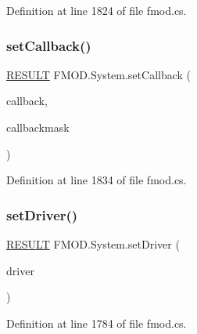 Definition at line 1824 of file fmod.\+cs.

\mbox{\label{class_f_m_o_d_1_1_system_ab5afef93b7bdd0f479aa2a8facb5cd20}} 
\subsubsection{\texorpdfstring{set\+Callback()}{setCallback()}}
{\footnotesize\ttfamily \hyperlink{namespace_f_m_o_d_a305d1176ef3f8c8815861a60407ac33d}{R\+E\+S\+U\+LT} F\+M\+O\+D.\+System.\+set\+Callback (\begin{DoxyParamCaption}\item[{\hyperlink{namespace_f_m_o_d_aa2778e41871e1fdfe9ecae550d4a45eb}{S\+Y\+S\+T\+E\+M\+\_\+\+C\+A\+L\+L\+B\+A\+CK}}]{callback,  }\item[{\hyperlink{namespace_f_m_o_d_aa5c808c3670f64c2b51ff4f216362a63}{S\+Y\+S\+T\+E\+M\+\_\+\+C\+A\+L\+L\+B\+A\+C\+K\+\_\+\+T\+Y\+PE}}]{callbackmask }\end{DoxyParamCaption})}



Definition at line 1834 of file fmod.\+cs.

\mbox{\label{class_f_m_o_d_1_1_system_ae33b8496a16bf9331fd960e613ef5d44}} 
\subsubsection{\texorpdfstring{set\+Driver()}{setDriver()}}
{\footnotesize\ttfamily \hyperlink{namespace_f_m_o_d_a305d1176ef3f8c8815861a60407ac33d}{R\+E\+S\+U\+LT} F\+M\+O\+D.\+System.\+set\+Driver (\begin{DoxyParamCaption}\item[{int}]{driver }\end{DoxyParamCaption})}



Definition at line 1784 of file fmod.\+cs.

\mbox{\label{class_f_m_o_d_1_1_system_a7341c3159435569b41e0004b0a2d674a}} 
